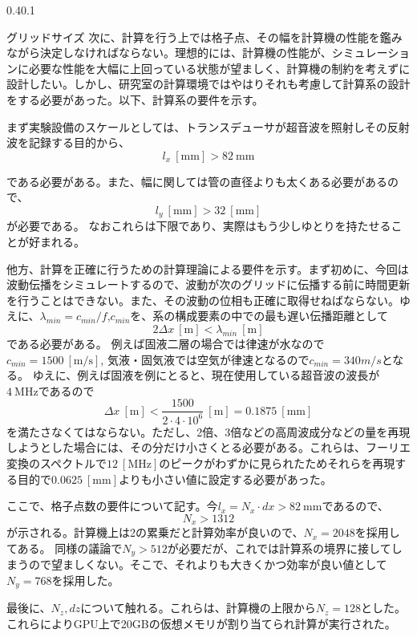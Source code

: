 \documentclass[uplatex]{suribt}
\makeatletter
\renewcommand{\subsection}{%
    \@startsection{subsection}{1}{\z@}%
    {0.4\Cvs}{0.1\Cvs}%
    {\normalfont\normalsize\headfont\raggedright}}
\makeatother
\begin{document}
\subsection{グリッドサイズ}
次に、計算を行う上では格子点、その幅を計算機の性能を鑑みながら決定しなければならない。理想的には、計算機の性能が、シミュレーションに必要な性能を大幅に上回っている状態が望ましく、計算機の制約を考えずに設計したい。しかし、研究室の計算環境ではやはりそれも考慮して計算系の設計をする必要があった。以下、計算系の要件を示す。\par
まず実験設備のスケールとしては、トランスデューサが超音波を照射しその反射波を記録する目的から、
\begin{equation}
    l_x\ [\mathrm{mm}] > 82 \ \mathrm{mm}
\end{equation}\par
である必要がある。また、幅に関しては管の直径よりも太くある必要があるので、
\begin{equation}
    l_y \ [\mathrm{mm}]> 32 \ [\mathrm{mm}]
\end{equation}
が必要である。
なおこれらは下限であり、実際はもう少しゆとりを持たせることが好まれる。\par
他方、計算を正確に行うための計算理論による要件を示す。まず初めに、今回は波動伝播をシミュレートするので、波動が次のグリッドに伝播する前に時間更新を行うことはできない。また、その波動の位相も正確に取得せねばならない。ゆえに、$\lambda_{min}=c_{min}/f$,$c_{min}$を、系の構成要素の中での最も遅い伝播距離として
\begin{equation}
    2 \Delta x\ [\mathrm{m}] < \lambda _{min}\ [\mathrm{m}]
\end{equation}
である必要がある。\cite{treeby2010k}
例えば固液二層の場合では律速が水なので$c_{min}=1500 \ [\mathrm{m/s}]$, 気液・固気液では空気が律速となるので$c_{min}=340 m/s$となる。
ゆえに、例えば固液を例にとると、現在使用している超音波の波長が$4 \ \mathrm{MHz}$であるので
\begin{equation}
    \Delta x \ [\mathrm{m}]< \frac{1500}{2 \cdot 4 \cdot 10^6} \ [\mathrm{m}]= 0.1875 \ [\mathrm{mm}]
\end{equation}
を満たさなくてはならない。ただし、2倍、3倍などの高周波成分などの量を再現しようとした場合には、その分だけ小さくとる必要がある。これらは、フーリエ変換のスペクトルで$12 \ [\mathrm{MHz}]$のピークがわずかに見られたためそれらを再現する目的で$0.0625 \ [\mathrm{mm}]$よりも小さい値に設定する必要があった。\par
ここで、格子点数の要件について記す。今$l_x =N_x \cdot dx > 82 \ \mathrm{mm}$であるので、
\begin{equation}
    N_x > 1312
\end{equation}
が示される。計算機上は2の累乗だと計算効率が良いので、$N_x=2048$を採用してある。
同様の議論で$N_y > 512$が必要だが、これでは計算系の境界に接してしまうので望ましくない。そこで、それよりも大きくかつ効率が良い値として$N_y=768$を採用した。\par
最後に、$N_z, dz$について触れる。これらは、計算機の上限から$N_z=128$とした。これらによりGPU上で20GBの仮想メモリが割り当てられ計算が実行された。
\end{document}

